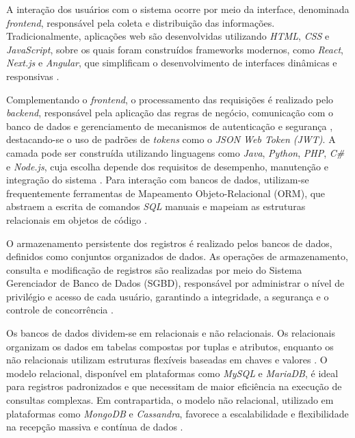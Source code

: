 \documentclass[12pt]{unisenaiclass}
\begin{document}
A interação dos usuários com o sistema ocorre por meio da interface, denominada \textit{frontend}, responsável pela coleta e distribuição das informações. Tradicionalmente, aplicações web são desenvolvidas utilizando \textit{HTML}, \textit{CSS} e \textit{JavaScript}, sobre os quais foram construídos frameworks modernos, como \textit{React}, \textit{Next.js} e \textit{Angular}, que simplificam o desenvolvimento de interfaces dinâmicas e responsivas \cite{javierweb2023}.

Complementando o \textit{frontend}, o processamento das requisições é realizado pelo \textit{backend}, responsável pela aplicação das regras de negócio, comunicação com o banco de dados e gerenciamento de mecanismos de autenticação e segurança \cite{owasp,jonesjwt2015}, destacando-se o uso de padrões de \textit{tokens} como o \textit{JSON Web Token (JWT)}. A camada pode ser construída utilizando linguagens como \textit{Java}, \textit{Python}, \textit{PHP}, \textit{C\#} e \textit{Node.js}, cuja escolha depende dos requisitos de desempenho, manutenção e integração do sistema \cite{javierweb2023}. Para interação com bancos de dados, utilizam-se frequentemente ferramentas de Mapeamento Objeto-Relacional (ORM), que abstraem a escrita de comandos \textit{SQL} manuais e mapeiam as estruturas relacionais em objetos de código \cite{fowlerapp2002}.

O armazenamento persistente dos registros é realizado pelos bancos de dados, definidos como conjuntos organizados de dados. As operações de armazenamento, consulta e modificação de registros são realizadas por meio do Sistema Gerenciador de Banco de Dados (SGBD), responsável por administrar o nível de privilégio e acesso de cada usuário, garantindo a integridade, a segurança e o controle de concorrência \cite{silberschatzbanco2006}.

Os bancos de dados dividem-se em relacionais e não relacionais. Os relacionais organizam os dados em tabelas compostas por tuplas e atributos, enquanto os não relacionais utilizam estruturas flexíveis baseadas em chaves e valores \cite{oliveirabanco2018}. O modelo relacional, disponível em plataformas como \textit{MySQL} e \textit{MariaDB}, é ideal para registros padronizados e que necessitam de maior eficiência na execução de consultas complexas. Em contrapartida, o modelo não relacional, utilizado em plataformas como \textit{MongoDB} e \textit{Cassandra}, favorece a escalabilidade e flexibilidade na recepção massiva e contínua de dados \cite{garciabanco2019}.
\end{document}
